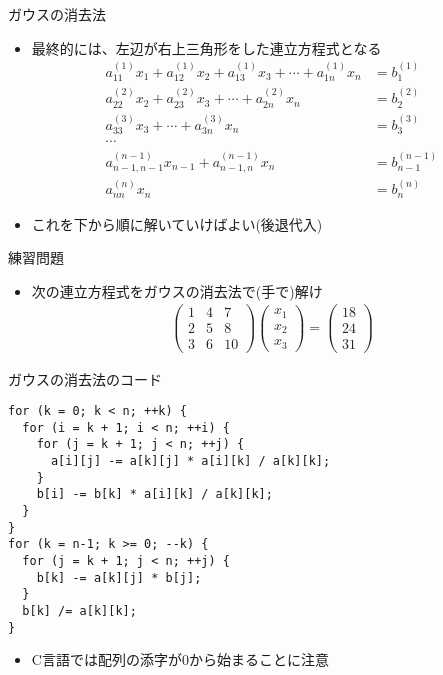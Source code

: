 \begin{frame}[t,fragile]{ガウスの消去法}
  \begin{itemize}
    \setlength{\itemsep}{1em}
  \item 最終的には、左辺が右上三角形をした連立方程式となる
    \begin{align*}
    a_{11}^{(1)} x_1 + a_{12}^{(1)} x_2 + a_{13}^{(1)} x_3 + \cdots + a_{1n}^{(1)} x_n &= b_{1}^{(1)} \\
    a_{22}^{(2)} x_2 + a_{23}^{(2)} x_3 + \cdots + a_{2n}^{(2)} x_n &= b_{2}^{(2)} \\
    a_{33}^{(3)} x_3 + \cdots + a_{3n}^{(3)} x_n &= b_{3}^{(3)} \\
    \cdots \\
    a_{n-1,n-1}^{(n-1)} x_{n-1} + a_{n-1,n}^{(n-1)} x_n &= b_{n-1}^{(n-1)} \\
    a_{nn}^{(n)} x_n &= b_{n}^{(n)}
    \end{align*}
  \item これを下から順に解いていけばよい(後退代入)
  \end{itemize}
\end{frame}

\begin{frame}[t,fragile]{練習問題}
  \begin{itemize}
    \setlength{\itemsep}{1em}
  \item 次の連立方程式をガウスの消去法で(手で)解け
    \begin{align*}
      \begin{pmatrix} 1 & 4 & 7 \\ 2 & 5 & 8 \\ 3 & 6 & 10 \end{pmatrix} \begin{pmatrix} x_1 \\ x_2 \\ x_3 \end{pmatrix} = \begin{pmatrix} 18 \\ 24 \\ 31 \end{pmatrix}
    \end{align*}
  \end{itemize}
\end{frame}

\begin{frame}[t,fragile]{ガウスの消去法のコード}
\begin{lstlisting}
for (k = 0; k < n; ++k) {
  for (i = k + 1; i < n; ++i) {
    for (j = k + 1; j < n; ++j) {
      a[i][j] -= a[k][j] * a[i][k] / a[k][k];
    }
    b[i] -= b[k] * a[i][k] / a[k][k];
  }
}
for (k = n-1; k >= 0; --k) {
  for (j = k + 1; j < n; ++j) {
    b[k] -= a[k][j] * b[j];
  }
  b[k] /= a[k][k];
}
\end{lstlisting}
\begin{itemize}
\item C言語では配列の添字が0から始まることに注意
\end{itemize}
\end{frame}


